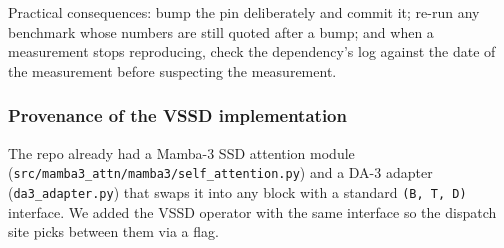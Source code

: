 \documentclass[11pt,a4paper]{article}
\begin{document}
Practical consequences: bump the pin deliberately and commit it; re-run any
benchmark whose numbers are still quoted after a bump; and when a measurement
stops reproducing, check the dependency's log against the date of the
measurement before suspecting the measurement.

\subsubsection{Provenance of the VSSD implementation}

The repo already had a Mamba-3 SSD attention module
(\texttt{src/\allowbreak{}mamba3\_\allowbreak{}attn/\allowbreak{}mamba3/\allowbreak{}self\_\allowbreak{}attention.py}) and a DA-3
adapter (\texttt{da3\_adapter.py}) that swaps it into any block with a
standard \texttt{(B, T, D)} interface. We added the VSSD operator with
the same interface so the dispatch site picks between them via a flag.
\end{document}
